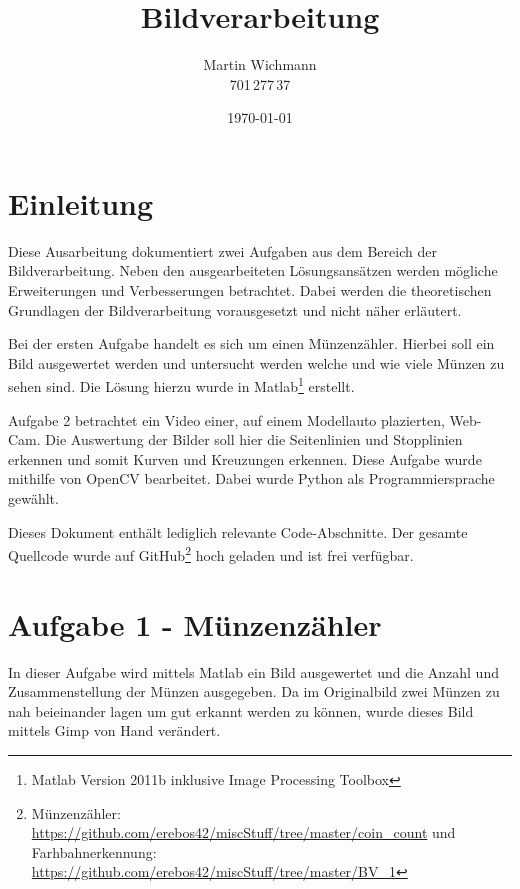 \documentclass[a4paper,DIV=calc,ngerman]{scrartcl}
\begin{document}
\titlehead{}
\title{Bildverarbeitung}
\author{Martin Wichmann\\701\,277\,37}
\date{\today}

\maketitle
\tableofcontents

\thispagestyle{empty}

\newpage
\setcounter{page}{1}

\section{Einleitung}
\label{sec:Einleitung}
Diese Ausarbeitung dokumentiert zwei Aufgaben aus dem Bereich der Bildverarbeitung. Neben den ausgearbeiteten Lösungsansätzen werden mögliche Erweiterungen und Verbesserungen betrachtet. Dabei werden die theoretischen Grundlagen der Bildverarbeitung vorausgesetzt und nicht näher erläutert.

Bei der ersten Aufgabe handelt es sich um einen Münzenzähler. Hierbei soll ein Bild ausgewertet werden und untersucht werden welche und wie viele Münzen zu sehen sind. Die Lösung hierzu wurde in Matlab\footnote{Matlab Version 2011b inklusive Image Processing Toolbox} erstellt.

Aufgabe 2 betrachtet ein Video einer, auf einem Modellauto plazierten, Web-Cam. Die Auswertung der Bilder soll hier die Seitenlinien und Stopplinien erkennen und somit Kurven und Kreuzungen erkennen. Diese Aufgabe wurde mithilfe von OpenCV bearbeitet. Dabei wurde Python als Programmiersprache gewählt.

Dieses Dokument enthält lediglich relevante Code-Abschnitte. Der gesamte Quellcode wurde auf GitHub\footnote{Münzenzähler: \url{https://github.com/erebos42/miscStuff/tree/master/coin_count} und Farhbahnerkennung: \url{https://github.com/erebos42/miscStuff/tree/master/BV_1}} hoch geladen und ist frei verfügbar.




\section{Aufgabe 1 - Münzenzähler}
\label{sec:aufgabe1}
In dieser Aufgabe wird mittels Matlab ein Bild ausgewertet und die Anzahl und Zusammenstellung der Münzen ausgegeben. Da im Originalbild zwei Münzen zu nah beieinander lagen um gut erkannt werden zu können, wurde dieses Bild mittels Gimp von Hand verändert.
\end{document}
